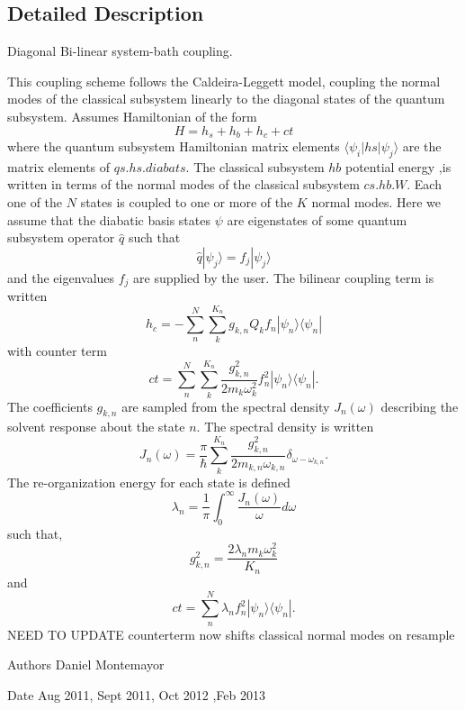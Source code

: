 \subsection{Detailed Description}
Diagonal Bi-\/linear system-\/bath coupling. 

This coupling scheme follows the Caldeira-\/\+Leggett model, coupling the normal modes of the classical subsystem linearly to the diagonal states of the quantum subsystem. Assumes Hamiltonian of the form \[ H=h_s+h_b+h_c+ct \] where the quantum subsystem Hamiltonian matrix elements $ \langle\psi_i|hs|\psi_j\rangle $ are the matrix elements of $qs.hs.diabats$. The classical subsystem $ hb $ potential energy ,is written in terms of the normal modes of the classical subsystem $cs.hb.W$. Each one of the $ N$ states is coupled to one or more of the $ K $ normal modes. Here we assume that the diabatic basis states $ \psi $ are eigenstates of some quantum subsystem operator $ \hat q $ such that \[ \hat q |\psi_j\rangle =f_j|\psi_j\rangle \] and the eigenvalues $ f_j $ are supplied by the user. The bilinear coupling term is written \[ h_c=-\sum_n^N \sum_k^{K_n} g_{k,n} Q_{k} f_n |\psi_n\rangle\langle\psi_n|\] with counter term \[ ct=\sum_n^N \sum_k^{K_n} \frac{g_{k,n}^2}{2m_{k}\omega_{k}^2}f_n^2 |\psi_n\rangle\langle\psi_n|. \] The coefficients $ g_{k,n} $ are sampled from the spectral density $ J_n(\omega)$ describing the solvent response about the state $ n $. The spectral density is written \[ J_n(\omega)=\frac{\pi}{\hbar}\sum_k^{K_n}\frac{g_{k,n}^2}{2m_{k,n}\omega_{k,n}}\delta_{\omega-\omega_{k,n}}.\] The re-\/organization energy for each state is defined \[ \lambda_n=\frac{1}{\pi} \int_0^\infty \frac{J_n(\omega)}{\omega} d\omega \] such that, \[ g_{k,n}^2=\frac{2\lambda_n m_{k} \omega_{k}^2}{K_n}\] and \[ ct=\sum_n^N \lambda_n f_n^2|\psi_n\rangle\langle\psi_n| .\] N\+E\+E\+D T\+O U\+P\+D\+A\+T\+E counterterm now shifts classical normal modes on resample \begin{DoxyAuthor}{Authors}
Daniel Montemayor
\end{DoxyAuthor}
\begin{DoxyDate}{Date}
Aug 2011, Sept 2011, Oct 2012 ,Feb 2013 
\end{DoxyDate}


